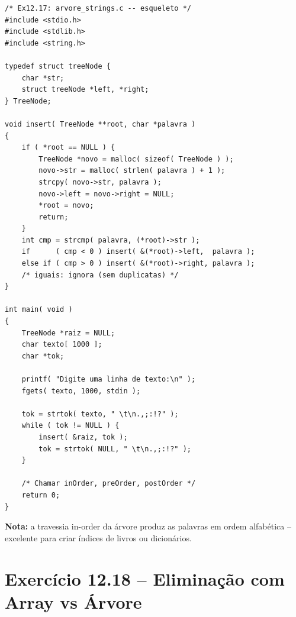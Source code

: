 \documentclass[12pt,a4paper]{article}
\begin{document}
\begin{respostabox}
\begin{lstlisting}
/* Ex12.17: arvore_strings.c -- esqueleto */
#include <stdio.h>
#include <stdlib.h>
#include <string.h>

typedef struct treeNode {
    char *str;
    struct treeNode *left, *right;
} TreeNode;

void insert( TreeNode **root, char *palavra )
{
    if ( *root == NULL ) {
        TreeNode *novo = malloc( sizeof( TreeNode ) );
        novo->str = malloc( strlen( palavra ) + 1 );
        strcpy( novo->str, palavra );
        novo->left = novo->right = NULL;
        *root = novo;
        return;
    }
    int cmp = strcmp( palavra, (*root)->str );
    if      ( cmp < 0 ) insert( &(*root)->left,  palavra );
    else if ( cmp > 0 ) insert( &(*root)->right, palavra );
    /* iguais: ignora (sem duplicatas) */
}

int main( void )
{
    TreeNode *raiz = NULL;
    char texto[ 1000 ];
    char *tok;

    printf( "Digite uma linha de texto:\n" );
    fgets( texto, 1000, stdin );

    tok = strtok( texto, " \t\n.,;:!?" );
    while ( tok != NULL ) {
        insert( &raiz, tok );
        tok = strtok( NULL, " \t\n.,;:!?" );
    }

    /* Chamar inOrder, preOrder, postOrder */
    return 0;
}
\end{lstlisting}

\textbf{Nota:} a travessia in-order da árvore produz as palavras em ordem
alfabética -- excelente para criar índices de livros ou dicionários.
\end{respostabox}

\section{Exercício 12.18 -- Eliminação com Array vs Árvore}
\end{document}
